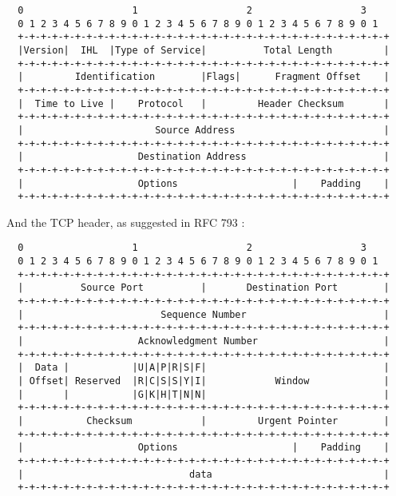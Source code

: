 \documentclass[11pt, a4paper]{article}
\begin{document}
\begin{lstlisting}
  0                   1                   2                   3
  0 1 2 3 4 5 6 7 8 9 0 1 2 3 4 5 6 7 8 9 0 1 2 3 4 5 6 7 8 9 0 1
  +-+-+-+-+-+-+-+-+-+-+-+-+-+-+-+-+-+-+-+-+-+-+-+-+-+-+-+-+-+-+-+-+
  |Version|  IHL  |Type of Service|          Total Length         |
  +-+-+-+-+-+-+-+-+-+-+-+-+-+-+-+-+-+-+-+-+-+-+-+-+-+-+-+-+-+-+-+-+
  |         Identification        |Flags|      Fragment Offset    |
  +-+-+-+-+-+-+-+-+-+-+-+-+-+-+-+-+-+-+-+-+-+-+-+-+-+-+-+-+-+-+-+-+
  |  Time to Live |    Protocol   |         Header Checksum       |
  +-+-+-+-+-+-+-+-+-+-+-+-+-+-+-+-+-+-+-+-+-+-+-+-+-+-+-+-+-+-+-+-+
  |                       Source Address                          |
  +-+-+-+-+-+-+-+-+-+-+-+-+-+-+-+-+-+-+-+-+-+-+-+-+-+-+-+-+-+-+-+-+
  |                    Destination Address                        |
  +-+-+-+-+-+-+-+-+-+-+-+-+-+-+-+-+-+-+-+-+-+-+-+-+-+-+-+-+-+-+-+-+
  |                    Options                    |    Padding    |
  +-+-+-+-+-+-+-+-+-+-+-+-+-+-+-+-+-+-+-+-+-+-+-+-+-+-+-+-+-+-+-+-+
\end{lstlisting}

And the TCP header, as suggested in RFC 793 \cite{rfc793}:

\begin{lstlisting}
  0                   1                   2                   3
  0 1 2 3 4 5 6 7 8 9 0 1 2 3 4 5 6 7 8 9 0 1 2 3 4 5 6 7 8 9 0 1
  +-+-+-+-+-+-+-+-+-+-+-+-+-+-+-+-+-+-+-+-+-+-+-+-+-+-+-+-+-+-+-+-+
  |          Source Port          |       Destination Port        |
  +-+-+-+-+-+-+-+-+-+-+-+-+-+-+-+-+-+-+-+-+-+-+-+-+-+-+-+-+-+-+-+-+
  |                        Sequence Number                        |
  +-+-+-+-+-+-+-+-+-+-+-+-+-+-+-+-+-+-+-+-+-+-+-+-+-+-+-+-+-+-+-+-+
  |                    Acknowledgment Number                      |
  +-+-+-+-+-+-+-+-+-+-+-+-+-+-+-+-+-+-+-+-+-+-+-+-+-+-+-+-+-+-+-+-+
  |  Data |           |U|A|P|R|S|F|                               |
  | Offset| Reserved  |R|C|S|S|Y|I|            Window             |
  |       |           |G|K|H|T|N|N|                               |
  +-+-+-+-+-+-+-+-+-+-+-+-+-+-+-+-+-+-+-+-+-+-+-+-+-+-+-+-+-+-+-+-+
  |           Checksum            |         Urgent Pointer        |
  +-+-+-+-+-+-+-+-+-+-+-+-+-+-+-+-+-+-+-+-+-+-+-+-+-+-+-+-+-+-+-+-+
  |                    Options                    |    Padding    |
  +-+-+-+-+-+-+-+-+-+-+-+-+-+-+-+-+-+-+-+-+-+-+-+-+-+-+-+-+-+-+-+-+
  |                             data                              |
  +-+-+-+-+-+-+-+-+-+-+-+-+-+-+-+-+-+-+-+-+-+-+-+-+-+-+-+-+-+-+-+-+
\end{lstlisting}
\end{document}
